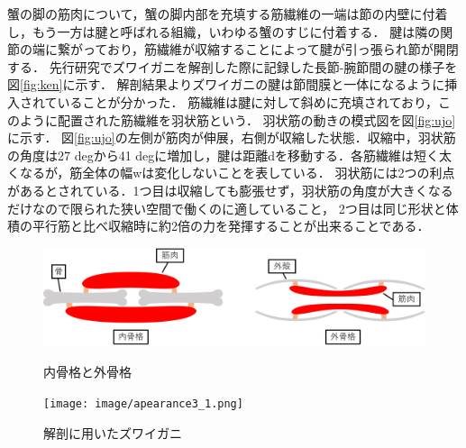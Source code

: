 蟹の脚の筋肉について，蟹の脚内部を充填する筋繊維の一端は節の内壁に付着し，もう一方は腱と呼ばれる組織，いわゆる蟹のすじに付着する．
腱は隣の関節の端に繋がっており，筋繊維が収縮することによって腱が引っ張られ節が開閉する．
先行研究\cite{hasegawa}でズワイガニを解剖した際に記録した長節-腕節間の腱の様子を図\ref{fig:ken}に示す．
解剖結果よりズワイガニの腱は節間膜と一体になるように挿入されていることが分かった\cite{hasegawa}．
筋繊維は腱に対して斜めに充填されており，このように配置された筋繊維を羽状筋という．
羽状筋の動きの模式図を図\ref{fig:ujo}に示す．
図\ref{fig:ujo}の左側が筋肉が伸展，右側が収縮した状態．収縮中，羽状筋の角度は27 degから41 degに増加し，腱は距離dを移動する．各筋繊維は短く太くなるが，筋全体の幅wは変化しないことを表している．
羽状筋には2つの利点があるとされている．1つ目は収縮しても膨張せず，羽状筋の角度が大きくなるだけなので限られた狭い空間で働くのに適していること，
2つ目は同じ形状と体積の平行筋と比べ収縮時に約2倍の力を発揮することが出来ることである\cite{warner1977biology}．
\begin{figure}[b]
  \begin{minipage}{0.49\hsize}
    \vspace{10mm}
    \centering
    \includegraphics[scale=0.058]{image/kokkaku.png}
    \vspace{5mm}
    \caption{内骨格と外骨格\cite{hasegawa}}
    \label{fig:naigai}
  \end{minipage}
  \begin{minipage}{0.49\hsize}
    \centering
    \texttt{[image: image/apearance3\_1.png]}
    \caption{解剖に用いたズワイガニ\cite{hasegawa}}
    \label{fig:zuwai}
  \end{minipage}
\end{figure}
